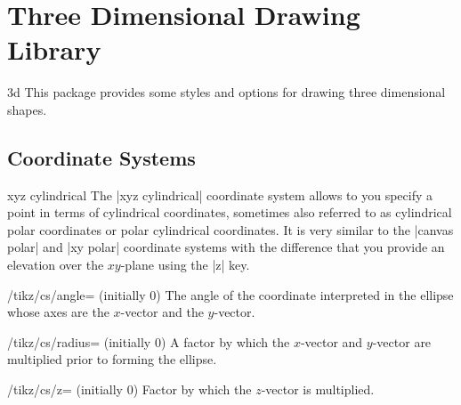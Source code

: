 %
%
%


\section{Three Dimensional Drawing Library}

\begin{tikzlibrary}{3d}
    This package provides some styles and options for drawing three dimensional
    shapes.
\end{tikzlibrary}


\subsection{Coordinate Systems}

\begin{coordinatesystem}{xyz cylindrical}
    The |xyz cylindrical| coordinate system allows to you specify a point in
    terms of cylindrical coordinates, sometimes also referred to as cylindrical
    polar coordinates or polar cylindrical coordinates. It is very similar to
    the |canvas polar| and |xy polar| coordinate systems with the difference
    that you provide an elevation over the $xy$-plane using the |z| key.
    \begin{key}{/tikz/cs/angle= (initially 0)}
        The angle of the coordinate interpreted in the ellipse whose axes are
        the $x$-vector and the $y$-vector.
    \end{key}
    \begin{key}{/tikz/cs/radius= (initially 0)}
        A factor by which the $x$-vector and $y$-vector are multiplied prior to
        forming the ellipse.
    \end{key}
    \begin{key}{/tikz/cs/z= (initially 0)}
        Factor by which the $z$-vector is multiplied.
    \end{key}
\begin{codeexample}[preamble={\usetikzlibrary{3d}}]
\end{codeexample}
\end{coordinatesystem}

